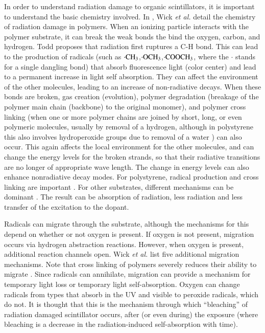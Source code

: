 In order to understand radiation damage to organic scintillators, it is important to
understand the basic chemistry involved.
In \cite{Wulkop1995141}, Wick {\it{et al.}} detail
the chemistry of radiation damage in polymers. 
When an ionizing particle interacts with the polymer substrate, it can
break the weak bonds the bind the oxygen, carbon, and hydrogen.
Todd\cite{todd} proposes that radiation first ruptures a C-H bond.
This can lead to the production
of radicals (such as  ${\rm \cdot CH_3}$,${\rm \cdot OCH_3}$,${\rm \cdot COOCH_3}$, where the $\cdot$ stands for a single dangling bond)
that absorb fluorescence light (color center) and lead to 
a permanent increase in light self absorption.
They can affect the environment of the other molecules, leading to
an increase of non-radiative decays.
When these bonds are broken, gas creation (evolution), polymer degradation (breakage 
of the polymer main chain (backbone) to the original monomer), 
and polymer cross linking
(when one or more polymer chains are joined by short, long, or even
polymeric molecules, usually by removal of a hydrogen,
although in polystyrene this also involves hydroperoxide groups due to removal of a water \cite{todd})
can also occur\cite{Wick1991472}.  
This again affects the local environment for the other molecules, and
can
change the energy levels for the broken strands, so that their
radiative transitions are no longer of appropriate wave length.
The change in energy levels can also enhance nonradiative decay modes.
For polystyrene, radical production and cross linking
are important \cite{Wick1991472}.  For other substrates, different
mechanisms can be dominant \cite{Wick1991472}.
The result can be absorption of radiation,
less radiation and less transfer of the
excitation to the dopant.


Radicals
can migrate through the substrate, although the mechanisms for this
depend on whether or not oxygen is present.  If oxygen
is not present, migration occurs via hydrogen abstraction reactions.
However, when oxygen is present, additional reaction channels open.
Wick {\it{et al.}} list five additional migration mechanisms.
Note that cross linking of polymers severely reduces their
ability to migrate \cite{weir}.
Since radicals can
annihilate, migration can provide  a mechanism for
temporary light loss or temporary light self-absorption.   
Oxygen can change radicals
from types that absorb in the UV and visible to peroxide radicals,
which do not.  It is thought that this is the mechanism
through which ``bleaching'' of radiation damaged scintillator
occurs, after (or even during) the exposure (where bleaching
is a decrease in the radiation-induced self-absorption with time).

